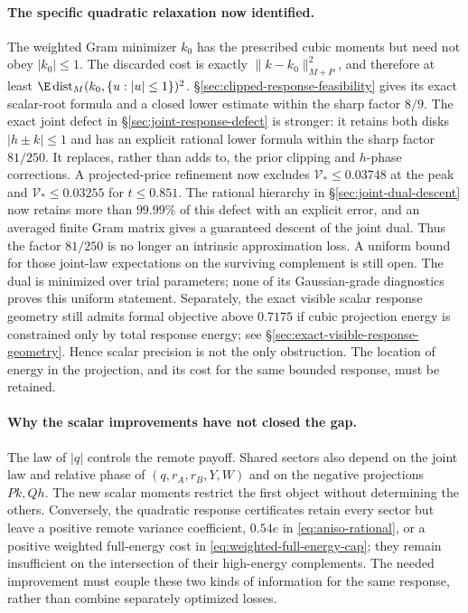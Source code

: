 \paragraph{The specific quadratic relaxation now identified.}
The weighted Gram minimizer $k_0$ has the prescribed cubic moments but
need not obey $|k_0|\le1$. The discarded cost is exactly
$\|k-k_0\|_{M+P}^2$, and therefore at least
$\E\operatorname{dist}_M(k_0,\{u:|u|\le1\})^2$.
\S\ref{sec:clipped-response-feasibility} gives its exact scalar-root
formula and a closed lower estimate within the sharp factor $8/9$.
The exact joint defect in \S\ref{sec:joint-response-defect} is stronger:
it retains both disks $|h\pm k|\le1$ and has an explicit rational
lower formula within the sharp factor $81/250$. It replaces, rather
than adds to, the prior clipping and $h$-phase corrections.
A projected-price refinement now excludes $\mathcal V_*\le0.03748$
at the peak and $\mathcal V_*\le0.03255$ for $t\le0.851$.
The rational hierarchy in \S\ref{sec:joint-dual-descent} now retains
more than $99.99\%$ of this defect with an explicit error, and an
averaged finite Gram matrix gives a guaranteed descent of the joint
dual. Thus the factor $81/250$ is no longer an intrinsic approximation
loss. A uniform bound for those joint-law expectations on the surviving
complement is still open. The dual is minimized over trial parameters;
none of its Gaussian-grade diagnostics proves this uniform statement.
Separately, the exact visible scalar response geometry still admits
formal objective above $0.7175$ if cubic projection energy is constrained
only by total response energy; see
\S\ref{sec:exact-visible-response-geometry}. Hence scalar precision is
not the only obstruction. The location of energy in the projection,
and its cost for the same bounded response, must be retained.

\paragraph{Why the scalar improvements have not closed the gap.}
The law of $|q|$ controls the remote payoff. Shared sectors also depend
on the joint law and relative phase of $(q,r_A,r_B,Y,W)$ and on the
negative projections $Pk,Qh$. The new scalar moments restrict the
first object without determining the others. Conversely, the quadratic
response certificates retain every sector but leave a positive remote
variance coefficient, $0.54e$ in \eqref{eq:aniso-rational}, or a positive
weighted full-energy cost in \eqref{eq:weighted-full-energy-cap}; they
remain insufficient on the intersection of their high-energy complements.
The needed improvement must couple these two kinds of information for
the same response, rather than combine separately optimized losses.

